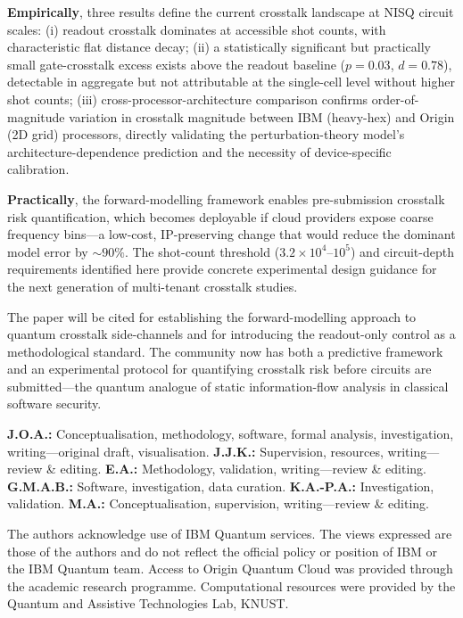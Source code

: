 \documentclass[ASNA,twocolumn]{USG}
\begin{document}
\textbf{Empirically}, three results define the current crosstalk landscape at NISQ circuit scales: (i) readout crosstalk dominates at accessible shot counts, with characteristic flat distance decay; (ii) a statistically significant but practically small gate-crosstalk excess exists above the readout baseline ($p = 0.03$, $d = 0.78$), detectable in aggregate but not attributable at the single-cell level without higher shot counts; (iii) cross-processor-architecture comparison confirms order-of-magnitude variation in crosstalk magnitude between IBM (heavy-hex) and Origin (2D grid) processors, directly validating the perturbation-theory model's architecture-dependence prediction and the necessity of device-specific calibration.

\textbf{Practically}, the forward-modelling framework enables pre-submission crosstalk risk quantification, which becomes deployable if cloud providers expose coarse frequency bins---a low-cost, IP-preserving change that would reduce the dominant model error by $\sim 90\%$. The shot-count threshold ($3.2\times10^4$--$10^5$) and circuit-depth requirements identified here provide concrete experimental design guidance for the next generation of multi-tenant crosstalk studies.

The paper will be cited for establishing the forward-modelling approach to quantum crosstalk side-channels and for introducing the readout-only control as a methodological standard. The community now has both a predictive framework and an experimental protocol for quantifying crosstalk risk before circuits are submitted---the quantum analogue of static information-flow analysis in classical software security.

\textbf{J.O.A.:} Conceptualisation, methodology, software, formal analysis, investigation, writing---original draft, visualisation. \textbf{J.J.K.:} Supervision, resources, writing---review \& editing. \textbf{E.A.:} Methodology, validation, writing---review \& editing. \textbf{G.M.A.B.:} Software, investigation, data curation. \textbf{K.A.-P.A.:} Investigation, validation. \textbf{M.A.:} Conceptualisation, supervision, writing---review \& editing.

The authors acknowledge use of IBM Quantum services. The views expressed are those of the authors and do not reflect the official policy or position of IBM or the IBM Quantum team. Access to Origin Quantum Cloud was provided through the academic research programme. Computational resources were provided by the Quantum and Assistive Technologies Lab, KNUST.
\end{document}
